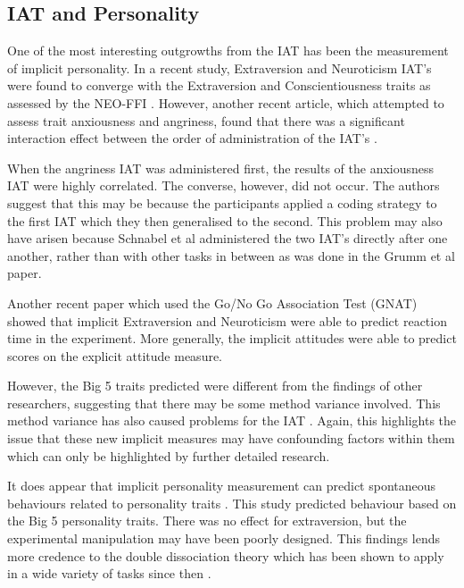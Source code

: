 \subsection{IAT and Personality}
\label{sec:iat-personality}
One of the most interesting outgrowths from the IAT has been the measurement of implicit personality. In a recent study, Extraversion and Neuroticism IAT's were found to converge with the Extraversion and Conscientiousness traits as assessed by the NEO-FFI \cite{Grumm2007}. However, another recent article, which attempted to assess trait anxiousness and angriness, found that there was a significant interaction effect between the order of administration of the IAT's \cite{Schnabel2006}. 

When the angriness IAT was administered first, the results of the anxiousness IAT were highly correlated. The converse, however, did not occur. The authors suggest that this may be because the participants applied a coding strategy to the first IAT which they then generalised to the second. This problem may also have arisen because Schnabel et al administered the two IAT's directly after one another, rather than with other tasks in between as was done in the Grumm et al paper. 

Another recent paper \cite{Boldero2007} which used the Go/No Go Association Test (GNAT) showed that implicit Extraversion and Neuroticism were able to predict reaction time in the experiment. More generally, the implicit attitudes were able to predict scores on the explicit attitude measure. 

However, the Big 5 traits predicted were different from the findings of other researchers, suggesting that there may be some method variance involved. This method variance has also caused problems for the IAT \cite{Mierke2003,Greenwald2003a} . Again, this highlights the issue that these new implicit measures may have confounding factors within them which can only be highlighted by further detailed research.

It does appear that implicit personality measurement can predict spontaneous behaviours related to  personality traits \cite{Steffens2006}. This study predicted behaviour based on the Big 5 personality traits. There was no effect for extraversion, but the experimental manipulation may have been poorly designed. This findings lends more credence to the double dissociation theory \cite{Asendorpf2002} which has been shown to apply in a wide variety of tasks since then \cite{Perugini2005,Conner2005}. 

